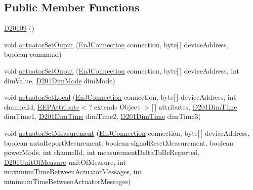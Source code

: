 \subsection*{Public Member Functions}
\begin{DoxyCompactItemize}
\item 
\hyperlink{classit_1_1polito_1_1elite_1_1enocean_1_1enj_1_1eep_1_1eep26_1_1_d2_1_1_d201_1_1_d20109_a261f1926c33a1aebcab18830fafabb5a}{D20109} ()
\item 
void \hyperlink{classit_1_1polito_1_1elite_1_1enocean_1_1enj_1_1eep_1_1eep26_1_1_d2_1_1_d201_1_1_d20109_a41aef8d3541b89f849a1ab256fa8b643}{actuator\+Set\+Ouput} (\hyperlink{classit_1_1polito_1_1elite_1_1enocean_1_1enj_1_1communication_1_1_en_j_connection}{En\+J\+Connection} connection, byte\mbox{[}$\,$\mbox{]} device\+Address, boolean command)
\item 
void \hyperlink{classit_1_1polito_1_1elite_1_1enocean_1_1enj_1_1eep_1_1eep26_1_1_d2_1_1_d201_1_1_d20109_a098e695e37eff327a11a08085113d75c}{actuator\+Set\+Ouput} (\hyperlink{classit_1_1polito_1_1elite_1_1enocean_1_1enj_1_1communication_1_1_en_j_connection}{En\+J\+Connection} connection, byte\mbox{[}$\,$\mbox{]} device\+Address, int dim\+Value, \hyperlink{enumit_1_1polito_1_1elite_1_1enocean_1_1enj_1_1eep_1_1eep26_1_1_d2_1_1_d201_1_1_d201_dim_mode}{D201\+Dim\+Mode} dim\+Mode)
\item 
void \hyperlink{classit_1_1polito_1_1elite_1_1enocean_1_1enj_1_1eep_1_1eep26_1_1_d2_1_1_d201_1_1_d20109_a9cae0233b642d726bfc3f3f26417abb4}{actuator\+Set\+Local} (\hyperlink{classit_1_1polito_1_1elite_1_1enocean_1_1enj_1_1communication_1_1_en_j_connection}{En\+J\+Connection} connection, byte\mbox{[}$\,$\mbox{]} device\+Address, int channel\+Id, \hyperlink{classit_1_1polito_1_1elite_1_1enocean_1_1enj_1_1eep_1_1_e_e_p_attribute}{E\+E\+P\+Attribute}$<$? extends Object $>$\mbox{[}$\,$\mbox{]} attributes, \hyperlink{enumit_1_1polito_1_1elite_1_1enocean_1_1enj_1_1eep_1_1eep26_1_1_d2_1_1_d201_1_1_d201_dim_time}{D201\+Dim\+Time} dim\+Time1, \hyperlink{enumit_1_1polito_1_1elite_1_1enocean_1_1enj_1_1eep_1_1eep26_1_1_d2_1_1_d201_1_1_d201_dim_time}{D201\+Dim\+Time} dim\+Time2, \hyperlink{enumit_1_1polito_1_1elite_1_1enocean_1_1enj_1_1eep_1_1eep26_1_1_d2_1_1_d201_1_1_d201_dim_time}{D201\+Dim\+Time} dim\+Time3)
\item 
void \hyperlink{classit_1_1polito_1_1elite_1_1enocean_1_1enj_1_1eep_1_1eep26_1_1_d2_1_1_d201_1_1_d20109_a9ea8a668de4eafe51ef2e77c8f44f4c2}{actuator\+Set\+Measurement} (\hyperlink{classit_1_1polito_1_1elite_1_1enocean_1_1enj_1_1communication_1_1_en_j_connection}{En\+J\+Connection} connection, byte\mbox{[}$\,$\mbox{]} device\+Address, boolean auto\+Report\+Mesurement, boolean signal\+Reset\+Measurement, boolean power\+Mode, int channel\+Id, int measurement\+Delta\+To\+Be\+Reported, \hyperlink{enumit_1_1polito_1_1elite_1_1enocean_1_1enj_1_1eep_1_1eep26_1_1_d2_1_1_d201_1_1_d201_unit_of_measure}{D201\+Unit\+Of\+Measure} unit\+Of\+Measure, int maximum\+Time\+Between\+Actuator\+Messages, int minimum\+Time\+Between\+Actuator\+Messages)

\end{DoxyCompactItemize}
